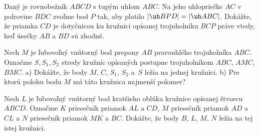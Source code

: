 {Daný je rovnobežník $ABCD$ s tupým uhlom $ABC$. Na jeho uhlopriečke $AC$ v polrovine $BDC$ zvoľme bod $P$ tak, aby platilo $|\uh BPD|=|\uh ABC|$. Dokážte, že priamka $CD$ je dotyčnicou ku kružnici opísanej trojuholníku $BCP$ práve vtedy, keď úsečky $AB$ a $BD$ sú zhodné.
\vpravo{[59--A--II--2]}

Nech $M$ je ľubovoľný vnútorný bod prepony $AB$ pravouhlého trojuholníka $ABC$. Označme $S,S_1,S_2$ stredy kružníc opísaných postupne trojuholníkom $ABC$, $AMC$, $BMC$.
{\everypar{}
\ite a) Dokážte, že body $M$, $C$, $S_1$, $S_2$ a~$S$ ležia na jednej kružnici.
\ite b) Pre ktorú polohu bodu $M$ má táto kružnica najmenší polomer?}
\vpravo{[56--A--II--3]}

Nech $L$ je ľubovoľný vnútorný bod kratšieho oblúka kružnice opísanej štvorcu $ABCD$. Označme $K$ priesečník priamok $AL$ a $CD$, $M$ priesečník priamok $AD$ a $CL$ a $N$ priesečník priamok $MK$ a $BC$. Dokážte, že body $B$, $L$, $M$, $N$ ležia na tej istej kružnici.
\vpravo{[53--A--III--5]}
}

